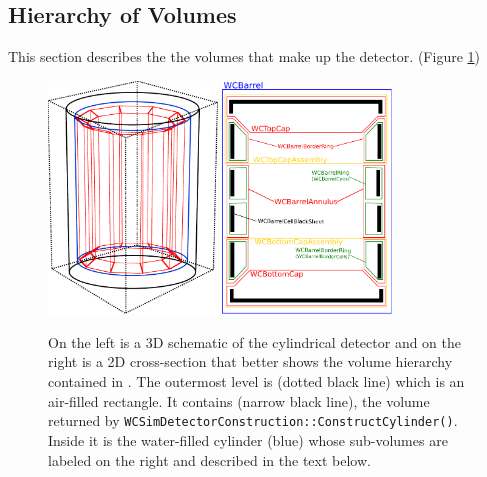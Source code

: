 \subsection{Hierarchy of Volumes}
This section describes the the volumes that make up the detector. (Figure \ref{fig:hi})
\begin{figure}[b!]
  \begin{center}
  \includegraphics[width=0.40\textwidth]{expHall2} 
  \hspace{0.1\textwidth}
  \includegraphics[width=0.40\textwidth]{annulus}
  \end{center}
  \caption{On the left is a 3D schematic of the cylindrical detector and on the right is a 2D cross-section that better shows the volume hierarchy contained in .  The outermost level is  (dotted black line) which is an air-filled rectangle.  It contains  (narrow black line), the volume returned by \texttt{WCSimDetectorConstruction::ConstructCylinder()}.  Inside it is the water-filled cylinder  (blue) whose sub-volumes are labeled on the right and described in the text below.}
\label{fig:hi}
\end{figure}


